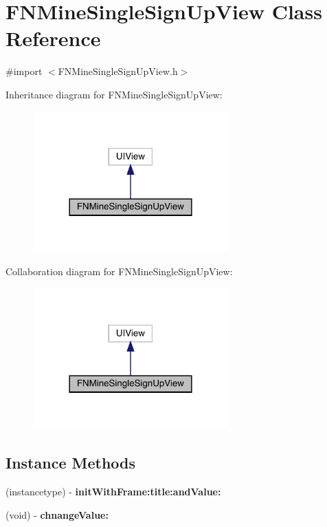 \hypertarget{interface_f_n_mine_single_sign_up_view}{}\section{F\+N\+Mine\+Single\+Sign\+Up\+View Class Reference}
\label{interface_f_n_mine_single_sign_up_view}


{\ttfamily \#import $<$F\+N\+Mine\+Single\+Sign\+Up\+View.\+h$>$}



Inheritance diagram for F\+N\+Mine\+Single\+Sign\+Up\+View\+:\nopagebreak
\begin{figure}[H]
\begin{center}
\leavevmode
\includegraphics[width=213pt]{interface_f_n_mine_single_sign_up_view__inherit__graph}
\end{center}
\end{figure}


Collaboration diagram for F\+N\+Mine\+Single\+Sign\+Up\+View\+:\nopagebreak
\begin{figure}[H]
\begin{center}
\leavevmode
\includegraphics[width=213pt]{interface_f_n_mine_single_sign_up_view__coll__graph}
\end{center}
\end{figure}
\subsection*{Instance Methods}
\begin{DoxyCompactItemize}
\item 
\mbox{\label{interface_f_n_mine_single_sign_up_view_ac67a4d4a6011c63b45ece9ba596d0382}} 
(instancetype) -\/ {\bfseries init\+With\+Frame\+:title\+:and\+Value\+:}
\item 
\mbox{\label{interface_f_n_mine_single_sign_up_view_a6da81513e863ff84325ff4b8d21f8e52}} 
(void) -\/ {\bfseries chnange\+Value\+:}
\end{DoxyCompactItemize}
